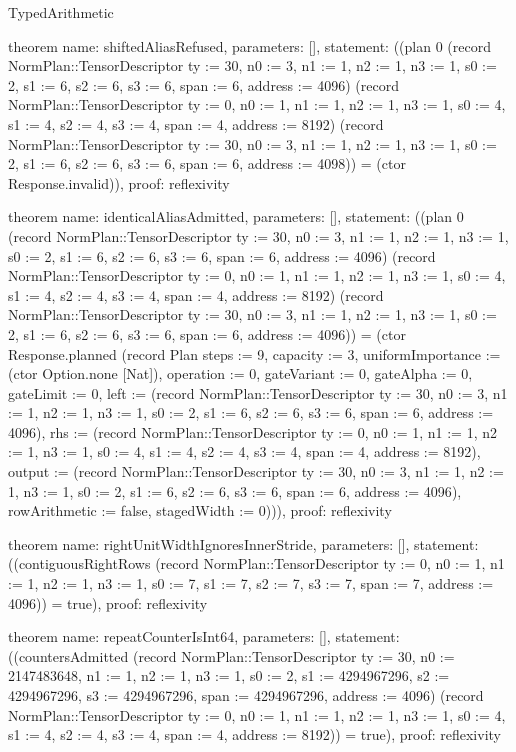 \begin{lexlean}{TypedArithmetic}
\begin{semanticmodule}
theorem{
  name: shiftedAliasRefused,
  parameters: [],
  statement: ((plan 0 (record NormPlan::TensorDescriptor {ty := 30, n0 := 3, n1 := 1, n2 := 1, n3 := 1, s0 := 2, s1 := 6, s2 := 6, s3 := 6, span := 6, address := 4096}) (record NormPlan::TensorDescriptor {ty := 0, n0 := 1, n1 := 1, n2 := 1, n3 := 1, s0 := 4, s1 := 4, s2 := 4, s3 := 4, span := 4, address := 8192}) (record NormPlan::TensorDescriptor {ty := 30, n0 := 3, n1 := 1, n2 := 1, n3 := 1, s0 := 2, s1 := 6, s2 := 6, s3 := 6, span := 6, address := 4098})) = (ctor Response.invalid)),
  proof: reflexivity{}
}

theorem{
  name: identicalAliasAdmitted,
  parameters: [],
  statement: ((plan 0 (record NormPlan::TensorDescriptor {ty := 30, n0 := 3, n1 := 1, n2 := 1, n3 := 1, s0 := 2, s1 := 6, s2 := 6, s3 := 6, span := 6, address := 4096}) (record NormPlan::TensorDescriptor {ty := 0, n0 := 1, n1 := 1, n2 := 1, n3 := 1, s0 := 4, s1 := 4, s2 := 4, s3 := 4, span := 4, address := 8192}) (record NormPlan::TensorDescriptor {ty := 30, n0 := 3, n1 := 1, n2 := 1, n3 := 1, s0 := 2, s1 := 6, s2 := 6, s3 := 6, span := 6, address := 4096})) = (ctor Response.planned (record Plan {steps := 9, capacity := 3, uniformImportance := (ctor Option.none [Nat]), operation := 0, gateVariant := 0, gateAlpha := 0, gateLimit := 0, left := (record NormPlan::TensorDescriptor {ty := 30, n0 := 3, n1 := 1, n2 := 1, n3 := 1, s0 := 2, s1 := 6, s2 := 6, s3 := 6, span := 6, address := 4096}), rhs := (record NormPlan::TensorDescriptor {ty := 0, n0 := 1, n1 := 1, n2 := 1, n3 := 1, s0 := 4, s1 := 4, s2 := 4, s3 := 4, span := 4, address := 8192}), output := (record NormPlan::TensorDescriptor {ty := 30, n0 := 3, n1 := 1, n2 := 1, n3 := 1, s0 := 2, s1 := 6, s2 := 6, s3 := 6, span := 6, address := 4096}), rowArithmetic := false, stagedWidth := 0}))),
  proof: reflexivity{}
}

theorem{
  name: rightUnitWidthIgnoresInnerStride,
  parameters: [],
  statement: ((contiguousRightRows (record NormPlan::TensorDescriptor {ty := 0, n0 := 1, n1 := 1, n2 := 1, n3 := 1, s0 := 7, s1 := 7, s2 := 7, s3 := 7, span := 7, address := 4096})) = true),
  proof: reflexivity{}
}

theorem{
  name: repeatCounterIsInt64,
  parameters: [],
  statement: ((countersAdmitted (record NormPlan::TensorDescriptor {ty := 30, n0 := 2147483648, n1 := 1, n2 := 1, n3 := 1, s0 := 2, s1 := 4294967296, s2 := 4294967296, s3 := 4294967296, span := 4294967296, address := 4096}) (record NormPlan::TensorDescriptor {ty := 0, n0 := 1, n1 := 1, n2 := 1, n3 := 1, s0 := 4, s1 := 4, s2 := 4, s3 := 4, span := 4, address := 8192})) = true),
  proof: reflexivity{}
}


\end{semanticmodule}
\end{lexlean}
